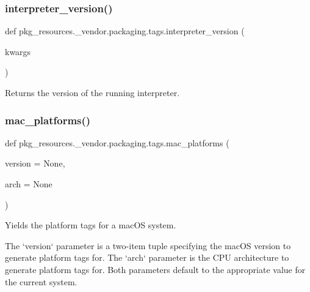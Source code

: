 \subsubsection{\texorpdfstring{interpreter\+\_\+version()}{interpreter\_version()}}
{\footnotesize\ttfamily def pkg\+\_\+resources.\+\_\+vendor.\+packaging.\+tags.\+interpreter\+\_\+version (\begin{DoxyParamCaption}\item[{}]{kwargs }\end{DoxyParamCaption})}

\begin{DoxyVerb}Returns the version of the running interpreter.
\end{DoxyVerb}
 \mbox{\label{namespacepkg__resources_1_1__vendor_1_1packaging_1_1tags_ac8e711072c821c82b6c4c0e90829bc1f}} 
\subsubsection{\texorpdfstring{mac\+\_\+platforms()}{mac\_platforms()}}
{\footnotesize\ttfamily def pkg\+\_\+resources.\+\_\+vendor.\+packaging.\+tags.\+mac\+\_\+platforms (\begin{DoxyParamCaption}\item[{}]{version = {\ttfamily None},  }\item[{}]{arch = {\ttfamily None} }\end{DoxyParamCaption})}

\begin{DoxyVerb}Yields the platform tags for a macOS system.

The `version` parameter is a two-item tuple specifying the macOS version to
generate platform tags for. The `arch` parameter is the CPU architecture to
generate platform tags for. Both parameters default to the appropriate value
for the current system.
\end{DoxyVerb}
 \mbox{\label{namespacepkg__resources_1_1__vendor_1_1packaging_1_1tags_a817d46e32760c5daa3f627cef05c4bb0}} 
